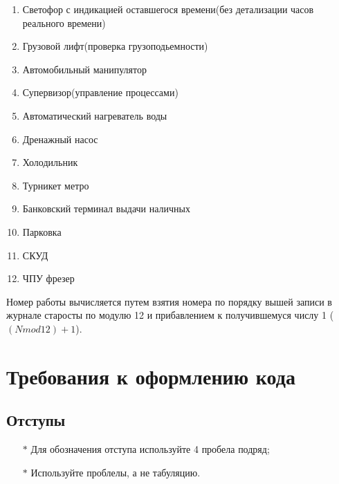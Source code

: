 \documentclass[12pt, twoside]{report}
\begin{document}
\begin{enumerate}
  \item Светофор с индикацией оставшегося времени(без детализации часов реального времени)
  \item Грузовой лифт(проверка грузоподьемности)
  \item Автомобильный манипулятор
  \item Супервизор(управление процессами)
  \item Автоматический нагреватель воды
  \item Дренажный насос
  \item Холодильник
  \item Турникет метро
  \item Банковский терминал выдачи наличных
  \item Парковка
  \item СКУД
  \item ЧПУ фрезер
\end{enumerate}

Номер работы вычисляется путем взятия номера по порядку вышей записи в журнале старосты по модулю 12 
и прибавлением к получившемуся числу 1 ($(N mod 12) + 1$).

\section*{Требования к оформлению кода}\label{lab_work_formatting}
 \label{style:cxx_code_style}

\subsection*{Отступы}\label{lab_work_formatting_tabs}
\begin{itemize}
	\item [$*$] Для обозначения отступа используйте 4 пробела подряд;
	\item [$*$] Используйте проблелы, а не табуляцию.
\end{itemize}
\end{document}
